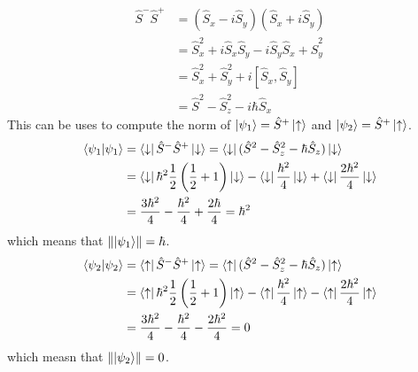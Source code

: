 \documentclass{article}
\begin{document}
\subsection{}
\begin{align*}
\hat{S}^-\hat{S}^+ &=(\hat{S}_x-i\hat{S}_y)(\hat{S}_x+i\hat{S}_y) \\
&= \hat{S}_x^2+i\hat{S}_x\hat{S}_y-i\hat{S}_y\hat{S}_x+\hat{S}_y^2 \\
&= \hat{S}_x^2+\hat{S}_y^2+i[\hat{S}_x,\hat{S}_y] \\
&= \hat{S}^2-\hat{S}_z^2-i\hbar\hat{S}_x
\end{align*}
This can be uses to compute the norm of $\ket{\psi_1} = \hat{S}^+\ket{\uparrow}$ and $\ket{\psi_2} = \hat{S}^+\ket{\uparrow}$.
\begin{align*}
\braket{\psi_1} &= \bra{\downarrow}\hat{S}^-\hat{S}^+\ket{\downarrow} = \bra{\downarrow}(\hat{S}^2-\hat{S}_z^2-\hbar\hat{S}_z)\ket{\downarrow} \\
&= \bra{\downarrow}\hbar^2\frac{1}{2}\left(\frac{1}{2} +1 \right)\ket{\downarrow} -\bra{\downarrow}\frac{\hbar^2}{4} \ket{\downarrow} +\bra{\downarrow}\frac{2\hbar^2}{4} \ket{\downarrow} \\
&= \frac{3\hbar^2}{4} -\frac{\hbar^2}{4}+\frac{2\hbar}{4} = \hbar^2 
\end{align*}
which means that $\norm{\ket{\psi_1}} = \hbar$.
\begin{align*}
\braket{\psi_2} &= \bra{\uparrow}\hat{S}^-\hat{S}^+\ket{\uparrow} = \bra{\uparrow}(\hat{S}^2-\hat{S}_z^2-\hbar\hat{S}_z)\ket{\uparrow} \\
&= \bra{\uparrow}\hbar^2\frac{1}{2}\left(\frac{1}{2} +1 \right)\ket{\uparrow} -\bra{\uparrow}\frac{\hbar^2}{4} \ket{\uparrow} -\bra{\uparrow}\frac{2\hbar^2}{4} \ket{\uparrow} \\
&= \frac{3\hbar^2}{4} -\frac{\hbar^2}{4}-\frac{2\hbar^2}{4} = 0
\end{align*}
which measn that $\norm{\ket{\psi_2}} = 0$.
\end{document}
